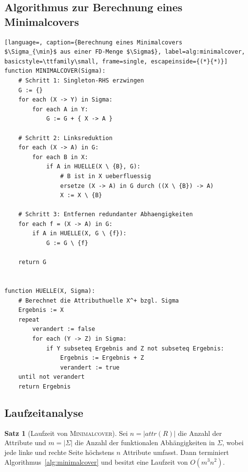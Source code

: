 ﻿\documentclass[a4paper,12pt]{report}
\theoremstyle{definition}
\newtheorem{theorem}{Satz}[chapter]
\theoremstyle{remark}
\newcommand{\att}{\mathit{attr}}
\begin{document}
\subsection{Algorithmus zur Berechnung eines Minimalcovers}

\begin{lstlisting}[language=, caption={Berechnung eines Minimalcovers
$\Sigma_{\min}$ aus einer FD-Menge $\Sigma$}, label=alg:minimalcover,
basicstyle=\ttfamily\small, frame=single, escapeinside={(*}{*)}]
function MINIMALCOVER(Sigma):
    # Schritt 1: Singleton-RHS erzwingen
    G := {}
    for each (X -> Y) in Sigma:
        for each A in Y:
            G := G + { X -> A }

    # Schritt 2: Linksreduktion
    for each (X -> A) in G:
        for each B in X:
            if A in HUELLE(X \ {B}, G):
                # B ist in X ueberfluessig
                ersetze (X -> A) in G durch ((X \ {B}) -> A)
                X := X \ {B}

    # Schritt 3: Entfernen redundanter Abhaengigkeiten
    for each f = (X -> A) in G:
        if A in HUELLE(X, G \ {f}):
            G := G \ {f}

    return G


function HUELLE(X, Sigma):
    # Berechnet die Attributhuelle X^+ bzgl. Sigma
    Ergebnis := X
    repeat
        verandert := false
        for each (Y -> Z) in Sigma:
            if Y subseteq Ergebnis and Z not subseteq Ergebnis:
                Ergebnis := Ergebnis + Z
                verandert := true
    until not verandert
    return Ergebnis
\end{lstlisting}

\subsection{Laufzeitanalyse}

\begin{theorem}[Laufzeit von \textsc{Minimalcover}]
\label{thm:laufzeit-minimalcover}
Sei $n=|\att(R)|$ die Anzahl der Attribute und $m=|\Sigma|$ die Anzahl
der funktionalen Abhängigkeiten in $\Sigma$, wobei jede linke und
rechte Seite höchstens $n$ Attribute umfasst. Dann terminiert
Algorithmus~\ref{alg:minimalcover} und besitzt eine Laufzeit von
$O(m^3 n^2)$.
\end{theorem}
\end{document}
